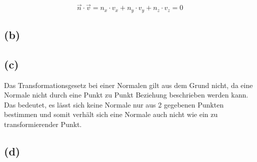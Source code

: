 \documentclass[12pt]{scrreprt}
\begin{document}
\[
	\vec{n} \cdot \vec{v} = n_x \cdot v_x + n_y \cdot v_y + n_z \cdot v_z = 0
\] 
\subsection*{(b)}
\subsection*{(c)}
Das Transformationsgesetz bei einer Normalen gilt aus dem Grund nicht, da eine Normale nicht durch eine Punkt zu Punkt Beziehung beschrieben werden kann. Das bedeutet, es lässt sich keine Normale nur aus 2 gegebenen Punkten bestimmen und somit verhält sich eine Normale auch nicht wie ein zu transformierender Punkt.
\subsection*{(d)}
\end{document}
